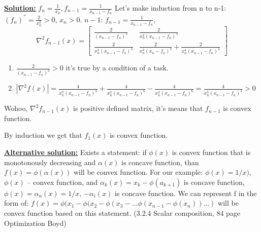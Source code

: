\underline{\textbf{Solution:}}
$f_n = \frac{1}{x_n}, f_{n-1} = \frac{1}{x_{n-1} - f_n}$
\newline 
Let's make induction from n to n-1: $(f_n)^{''} = \frac{2}{x_n^3} > 0$, $x_n > 0$.
\newline 
$n - 1$: $f_{n-1} = \frac{1}{x_{n-1} - f_n}$, 
\begin{equation*}
    \nabla^2 f_{n-1}(x) = 
    \begin{bmatrix}
    \frac{2}{(x_{n-1}-f_n)^3} & \frac{2}{x_n^2(x_{n-1} -f_n)^3} \\
    \frac{2}{x_n^2(x_{n-1} -f_n)^3} & \frac{2}{x_n^3(x_n-f_n)^2} + \frac{2}{x_n^4(x_{n-1} - f_n)^3} 
    \end{bmatrix}
\end{equation*}
\begin{enumerate}
    \item $\frac{2}{(x_{n-1}-f_n)^3} > 0$ it's true by a condition of a task.

    \item $|\nabla^2f(x)| = \frac{4}{x_n^3(x_{n-1}-f_n)^3} + \frac{4}{x_n^4(x_{n-1}-f_n)^6} - \frac{4}{x_n^4(x_{n-1}-f_n)^6} = \frac{4}{x_n^3(x_{n-1} -f_n)^3} > 0$
\end{enumerate}

Wohoo, $\nabla^2 f_{n-1}(x)$ is positive defined matrix, it's means that $f_{n-1}$ is convex function.

By induction we get that $f_1(x)$ is convex function.

\underline{\textbf{Alternative solution:}}
Exists a statement: if $\phi(x)$ is convex function that is monotonously decreasing and $\alpha(x)$ is concave function, than $f(x) = \phi(\alpha(x))$ will be convex function. 
For our example: $\phi(x) = 1/x)$, $\phi(x)$ -- convex function, and $\alpha_k(x) = x_k - \phi(a_{k+1})$ is concave function, $\phi(x) = \alpha_n(x) = 1/x$, $-\alpha_i(x)$ is concave function.
\newline
We can represent f in the form of:
$f(x) = \phi(x_1 - \phi(x_2 - \phi(x_{3} - ... \phi(x_{n-1} - \phi(x_n))...)$ will be convex function based on this statement. (3.2.4 Scalar composition, 84 page Optimization Boyd)
